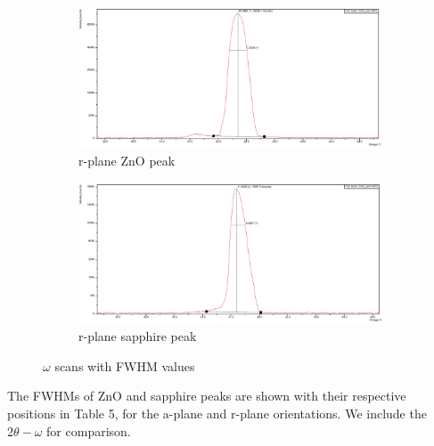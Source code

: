 \documentclass{article}
\begin{document}
\begin{figure}[h]
    \vspace{1em} %

    \begin{subfigure}[b]{0.45\textwidth}
        \centering
        \includegraphics[width=\textwidth]{Figures/w-scan-r-plane-sapphire-peaks.jpg} %
        \caption{r-plane ZnO peak}
        \label{fig:subfig3}
    \end{subfigure}
    \hfill
    \begin{subfigure}[b]{0.45\textwidth}
        \centering
        \includegraphics[width=\textwidth]{Figures/w-scan-ZnO-on-r-plane-sapphire-peaks.jpg} %
        \caption{r-plane sapphire peak}
        \label{fig:subfig4}
    \end{subfigure}

    \caption{$\omega$ scans with FWHM values}
    \label{fig:grouped}
\end{figure}

The FWHMs of ZnO and sapphire peaks are shown with their respective positions  in Table 5, for the a-plane and r-plane orientations. We include the $2\theta - \omega$ for comparison. 
\end{document}
